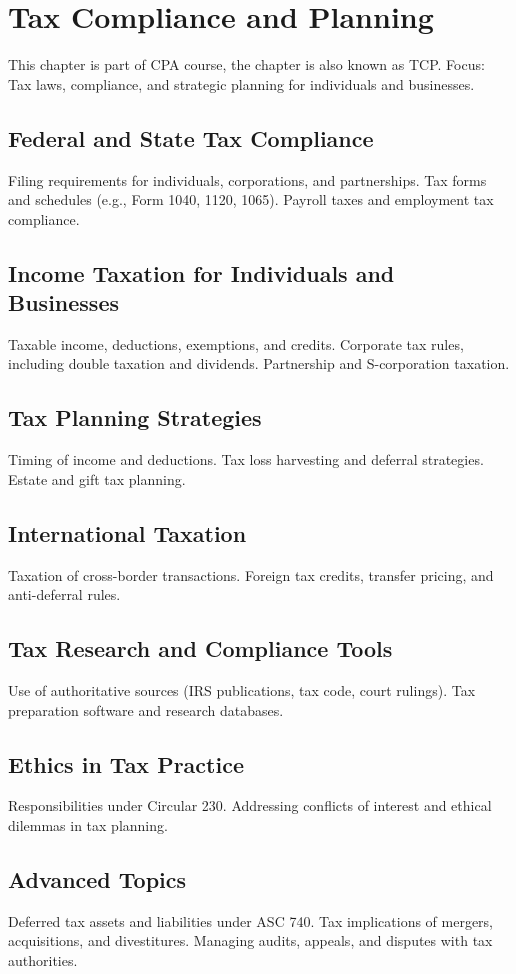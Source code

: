 \chapter{Tax Compliance and Planning}
This chapter is part of CPA course, the chapter is also known as TCP.
Focus: Tax laws, compliance, and strategic planning for individuals and businesses.

\section{Federal and State Tax Compliance}
Filing requirements for individuals, corporations, and partnerships.
Tax forms and schedules (e.g., Form 1040, 1120, 1065).
Payroll taxes and employment tax compliance.

\section{Income Taxation for Individuals and Businesses}
Taxable income, deductions, exemptions, and credits.
Corporate tax rules, including double taxation and dividends.
Partnership and S-corporation taxation.

\section{Tax Planning Strategies}
Timing of income and deductions.
Tax loss harvesting and deferral strategies.
Estate and gift tax planning.

\section{International Taxation}
Taxation of cross-border transactions.
Foreign tax credits, transfer pricing, and anti-deferral rules.

\section{Tax Research and Compliance Tools}
Use of authoritative sources (IRS publications, tax code, court rulings).
Tax preparation software and research databases.

\section{Ethics in Tax Practice}
Responsibilities under Circular 230.
Addressing conflicts of interest and ethical dilemmas in tax planning.

\section{Advanced Topics}
Deferred tax assets and liabilities under ASC 740.
Tax implications of mergers, acquisitions, and divestitures.
Managing audits, appeals, and disputes with tax authorities.